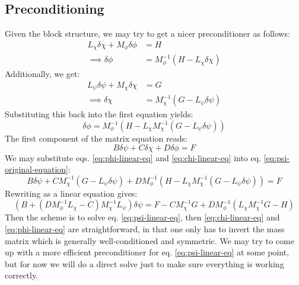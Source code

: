 \documentclass[reqno]{article}
\begin{document}
\subsection{Preconditioning}
Given the block structure, we may try to get a nicer preconditioner as follows:
\begin{equation} \label{eq:phi-linear-eq}
    \begin{split}
        L_\chi \delta \chi + M_\phi \delta \phi &= H \\
        \implies \delta \phi &= M_\phi^{-1} \left( H - L_\chi \delta \chi \right)
    \end{split}
\end{equation}
Additionally, we get:
\begin{equation} \label{eq:chi-linear-eq}
    \begin{split}
        L_\psi \delta \psi + M_\chi \delta \chi &= G \\
        \implies \delta \chi &= M_\chi^{-1} \left( G - L_\psi \delta \psi \right)
    \end{split}
\end{equation}
Substituting this back into the first equation yields:
\begin{equation}
    \delta \phi
    =
    M_\phi^{-1} \left( H - L_\chi M_\chi^{-1} \left(G - L_\psi \delta \psi \right) \right)
\end{equation}
The first component of the matrix equation reads:
\begin{equation} \label{eq:psi-original-equation}
    B \delta \psi
    + C \delta \chi
    + D \delta \phi
    =
    F
\end{equation}
We may substitute eqs. \eqref{eq:phi-linear-eq} and \eqref{eq:chi-linear-eq} into eq. \eqref{eq:psi-original-equation}:
\begin{equation}
    B \delta \psi 
    + C M_\chi^{-1} \left(G - L_\psi \delta \psi \right)
    + D M_\phi^{-1} \left(H - L_\chi M_\chi^{-1} \left(G - L_\psi \delta \psi \right) \right)
    =
    F
\end{equation}
Rewriting as a linear equation gives:
\begin{equation} \label{eq:psi-linear-eq}
    \left(B + \left( D M_\phi^{-1} L_\chi - C \right) M_\chi^{-1} L_\psi \right) \delta \psi
    =
    F - C M_\chi^{-1} G + D M_\phi^{-1} \left( L_\chi M_\chi^{-1} G - H \right)
\end{equation}
Then the scheme is to solve eq. \eqref{eq:psi-linear-eq}, then \eqref{eq:chi-linear-eq} and \eqref{eq:phi-linear-eq} are straightforward, in that one only has to invert the mass matrix which is generally well-conditioned and symmetric.
We may try to come up with a more efficient preconditioner for eq. \eqref{eq:psi-linear-eq} at some point, but for now we will do a direct solve just to make sure everything is working correctly.
\end{document}
